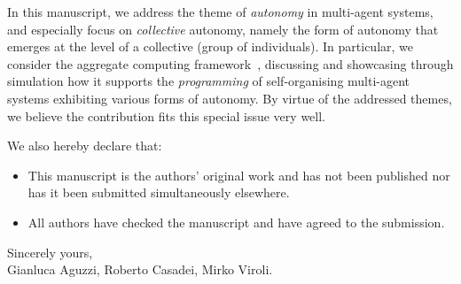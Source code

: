 \documentclass{article}
\begin{document}
In this manuscript,
 we address the theme of \emph{autonomy} in multi-agent systems,
 and especially focus on \emph{collective} autonomy,
 namely the form of autonomy that emerges at the level of a collective (group of individuals).
%
In particular, 
 we consider the aggregate computing framework~\cite{DBLP:journals/computer/BealPV15,viroli2019jlamp-si-coord},
 discussing and showcasing through simulation 
 how it supports
 the \emph{programming} of self-organising multi-agent systems
 exhibiting various forms of autonomy.
%
%
By virtue of the addressed themes, 
 we believe the contribution fits this special issue very well.

We also hereby declare that:
%
\begin{itemize}
\item This manuscript is the authors' original work and has not been published nor has it been submitted simultaneously elsewhere.
\item All authors have checked the manuscript and have agreed to the submission. 
\end{itemize}

Sincerely yours,\\
Gianluca Aguzzi, Roberto Casadei, Mirko Viroli.


\printbibliography
\end{document}
